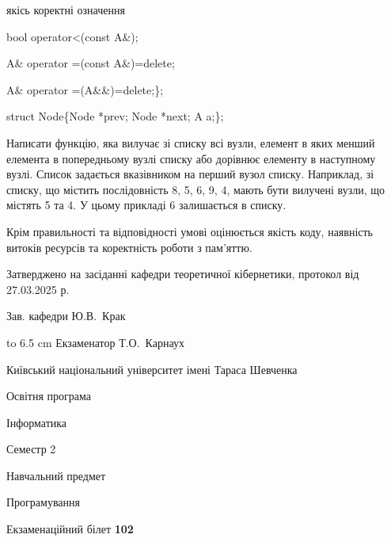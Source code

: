 \documentclass[12pt, ukrainian]{article}
\begin{document}
{\quad  якісь коректні означення 

\quad  bool operator<(const A\&); 

\quad A\& operator =(const A\&)=delete; 

\quad  A\& operator =(A\&\&)=delete;\};

struct Node\{Node *prev; Node *next; A a;\};

Написати функцію, яка вилучає зі списку всі вузли, елемент в яких менший елемента в попередньому вузлі списку або дорівнює елементу в наступному вузлі. Список задається вказівником на перший вузол списку. Наприклад, зі списку, що містить послідовність 8, 5, 6, 9, 4, мають бути вилучені вузли, що містять 5 та 4. У цьому прикладі 6 залишається в списку.

Крім правильності та відповідності умові оцінюється якість коду, наявність витоків ресурсів та коректність роботи з пам'яттю. 

}
{\smallskip\smallskip \begin {scriptsize} Затверджено на засіданні кафедри теоретичної кібернетики, протокол   від   27.03.2025 р.\par\smallskip\smallskip\smallskip\smallskip
{\parbox {6.5 cm} {Зав. кафедри \dotfill Ю.В.~Крак}}\hspace {0.7cm} {\hbox to 6.5 cm { Екзаменатор \dotfill Т.О.~Карнаух}} \end{scriptsize}}
\newpage
{{\begin {scriptsize}\par
{ \center  Київський національний університет імені Тараса Шевченка \par}
{\parbox {5 cm}{Освітня програма \hfill}{\parbox {7 cm}{Інформатика\hfill}}\parbox {6 cm}{\hfill Семестр 2}}\par
{\parbox {5 cm} {Навчальний предмет \hfill}\parbox {7 cm}{Програмування \hfill}\parbox {6cm}{\hfill}\par}\vspace{-15pt} \end{scriptsize}}{\center Екзаменаційний білет \No \textbf { 102 }\par}}
\end{document}
